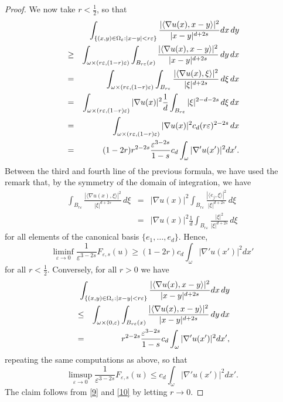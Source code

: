 \documentclass{article}
\newcommand{\e}{\varepsilon}
\begin{document}
\begin{proof}
We now take $r<\frac12$, so that 
\begin{eqnarray*}
&&\hskip-1cm\int_{\{(x,y)\in\Omega_\e: |x-y|<r\e\}}\frac{|\langle \nabla u(x), x-y\rangle|^2}{|x-y|^{d+2s}} dx\,dy\\
&\ge &\int_{\omega\times (r\e,(1-r)\e)}\int_{B_{r\e}(x)}\frac{|\langle \nabla u(x), x-y\rangle|^2}{|x-y|^{d+2s}}\,dy\,dx\\
&=&\int_{\omega\times (r\e,(1-r)\e)}\int_{B_{r\e}}\frac{|\langle \nabla u(x), \xi\rangle|^2}{|\xi|^{d+2s}}\,d\xi\,dx\\
&=&\int_{\omega\times (r\e,(1-r)\e)}|\nabla u(x)|^2\frac1d\int_{B_{r\e}}|\xi|^{2-d-2s}\,d\xi\,dx\\
&=&\int_{\omega\times (r\e,(1-r)\e)}|\nabla u(x)|^2c_d(r\e)^{2-2s}\,dx\\
&=&(1-2r)r^{2-2s}\frac{\e^{3-2s}}{1-s}c_d\int_{\omega}|\nabla' u(x')|^2dx'.
\end{eqnarray*}
Between the third and fourth line of the previous formula, we have used the remark that, by the symmetry of the domain of integration, we have 
\begin{eqnarray*}
\int_{B_{r\e}}\frac{|\langle \nabla u(x), \xi\rangle|^2}{|\xi|^{d+2s}}\,d\xi&=&|\nabla u(x)|^2 \int_{B_{r\e}}\frac{|\langle e_j, \xi\rangle|^2}{|\xi|^{d+2s}}\,d\xi\\
&=&|\nabla u(x)|^2 \frac1d\int_{B_{r\e}}\frac{|\xi|^2}{|\xi|^{d+2s}}\,d\xi
\end{eqnarray*}
for all elements of the canonical basis $\{e_1,\ldots, e_d\}$.
Hence,
\begin{equation}\label{9}
\liminf_{\e\to 0}\frac{1}{\e^{3-2s}}F_{\e,s}(u)\ge (1-2r)c_d\int_{\omega}|\nabla' u(x')|^2dx'
\end{equation}
for all $r<\frac12$. Conversely, for all $r>0$ we have
\begin{eqnarray}\label{a3}\nonumber
&&\hskip-1cm\int_{\{(x,y)\in\Omega_\e: |x-y|<r\e\}}\frac{|\langle \nabla u(x), x-y\rangle|^2}{|x-y|^{d+2s}} dx\,dy\\ \nonumber
&\le &\int_{\omega\times (0,\e)}\int_{B_{r\e}(x)}\frac{|\langle \nabla u(x), x-y\rangle|^2}{|x-y|^{d+2s}}\,dy\,dx
\\
&=&r^{2-2s}\frac{\e^{3-2s}}{1-s}c_d\int_{\omega}|\nabla' u(x')|^2dx',
\end{eqnarray}
repeating the same computations as above, so that 
\begin{equation}\label{10}
\limsup_{\e\to 0}\frac{1}{\e^{3-2s}}F_{\e,s}(u)\le c_d\int_{\omega}|\nabla' u(x')|^2dx'.
\end{equation}
The claim follows from \eqref{9} and \eqref{10} by letting $r\to 0$.
\end{proof}
\end{document}
